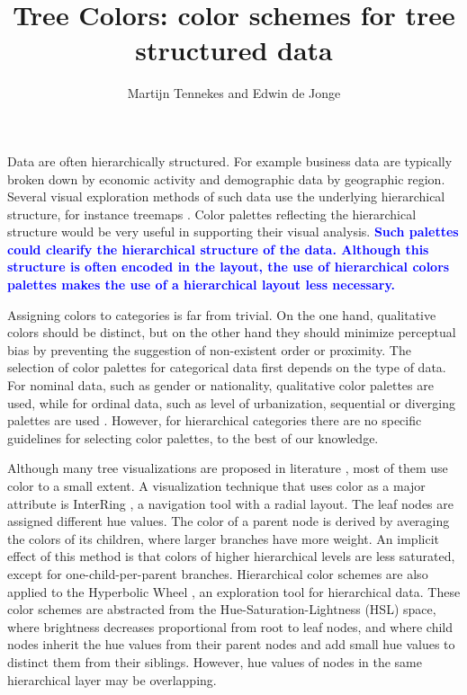 \documentclass[review,journal]{vgtc}         %
\title{Tree Colors: color schemes for tree structured data}
\author{Martijn Tennekes and Edwin de Jonge}
\newcommand{\changedM}[1]{\textcolor{blue}{\textbf{#1}}}
\begin{document}
\lstset{language=R}

\label{secintro}

\maketitle
Data are often hierarchically structured. For example business data are typically broken down by economic activity and demographic data by geographic region. Several visual exploration methods of such data use the underlying hierarchical structure, for instance treemaps
\cite{shneiderman1992,tennekes2011b}. Color palettes reflecting the hierarchical structure would be very useful in supporting their visual analysis. \changedM{Such palettes could clearify the hierarchical structure of the data. Although this structure is often encoded in the layout, the use of hierarchical colors palettes makes the use of a hierarchical layout less necessary.}

Assigning colors to categories is far from trivial. On the one hand, qualitative colors should be distinct, but on the other hand they should minimize perceptual bias by preventing the suggestion of non-existent order or proximity. The selection of color palettes for categorical data first depends on the type of data. For nominal data, such as gender or nationality, qualitative color palettes are used, while for ordinal data, such as level of urbanization, sequential or diverging palettes are used \cite{brewer03, zeileis2009}. However, for hierarchical categories there are no specific guidelines for selecting color palettes, to the best of our knowledge.

Although many tree visualizations are proposed in literature \cite{schulz2011}, most of them use color to a small extent. A visualization technique that uses color as a major attribute is InterRing \cite{yang2002}, a navigation tool with a radial layout. The leaf nodes are assigned different hue values. The color of a parent node is derived by averaging the colors of its children, where larger branches have more weight. An implicit effect of this method is that colors of higher hierarchical levels are less saturated, except for one-child-per-parent branches. Hierarchical color schemes are also applied to the Hyperbolic Wheel \cite{lam2012}, an exploration tool for hierarchical data.  These color schemes are abstracted from the Hue-Saturation-Lightness (HSL) space, where brightness decreases proportional from root to leaf nodes, and where child nodes inherit the hue values from their parent nodes and add small hue values to distinct them from their siblings. However, hue values of nodes in the same hierarchical layer may be overlapping.
\end{document}
